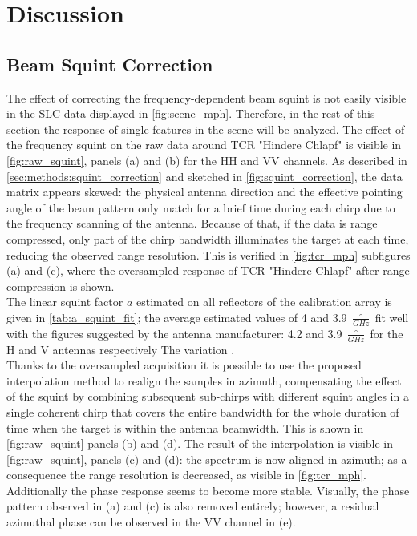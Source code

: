 \section{Discussion}\label{sec:discussion}
\subsection{Beam Squint Correction}\label{sec:discussion:squint_correction}
The effect of correcting the frequency-dependent beam squint is not easily visible in the SLC data displayed in \autoref{fig:scene_mph}. Therefore, in the rest of this section the response of single features in the scene will be analyzed.
The effect of the frequency squint on the raw data around TCR "Hindere Chlapf" is visible in \autoref{fig:raw_squint}, panels (a) and (b) for the HH and VV channels. As described in 
\autoref{sec:methods:squint_correction} and sketched in \autoref{fig:squint_correction}, the data matrix appears skewed:  the physical antenna direction and the effective pointing angle of the beam pattern only match for a brief time during each chirp due to the frequency scanning of the antenna. Because of that, if the data is range compressed, only part of the chirp bandwidth illuminates the target at each time, reducing the observed range resolution. This is verified in \autoref{fig:tcr_mph} subfigures (a) and (c), where the oversampled response of TCR "Hindere Chlapf" after range compression is shown.\\
The linear squint factor $a$ estimated on all reflectors of the calibration array is given in \autoref{tab:a_squint_fit};
the average estimated values of 4 and 3.9 $\frac{\circ}{GHz}$  fit well with the figures suggested by the antenna manufacturer: 4.2 and 3.9 $\frac{\circ}{GHz}$ for the H and V antennas respectively The variation .\\
Thanks to the oversampled acquisition it is possible to use the proposed interpolation method to realign the samples in azimuth, compensating the effect of the squint by combining subsequent sub-chirps with different squint angles in a single coherent chirp that covers the entire bandwidth for the whole duration of time when the target is within the antenna beamwidth. This is shown in \autoref{fig:raw_squint} panels (b) and (d). The result of the interpolation is visible in \autoref{fig:raw_squint}, panels (c) and (d): the spectrum is now aligned in azimuth; as a consequence the range resolution is decreased, as visible in \autoref{fig:tcr_mph}. Additionally the phase response seems to become more stable.
Visually, the phase pattern observed in (a) and (c) is also removed entirely; however, a residual azimuthal phase can be observed in the VV channel in (e).
